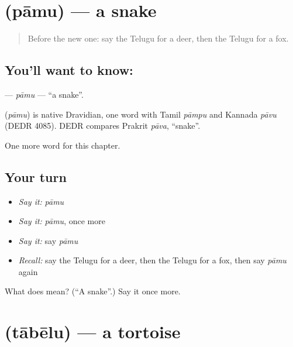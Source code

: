 \section[\texorpdfstring{\te{పాము} (pāmu)}{పాము (pāmu)}]{ (pāmu) — a snake}

\label{lesson:TE-C124-pamu}



\begin{quote}
Before the new one: say the Telugu for a deer, then the Telugu for a fox.
\end{quote}

\subsection*{You'll want to know: }
\textbf{} — \emph{pāmu} — \textquotedblleft{}a snake\textquotedblright{}.

\begin{cousinweb}
\textbf{} (\emph{pāmu}) is native Dravidian, one word with Tamil \emph{pāmpu} and Kannada \emph{pāvu} (DEDR 4085). DEDR compares Prakrit \emph{pāva}, \textquotedblleft{}snake\textquotedblright{}.
\end{cousinweb}

\begin{grammarlens}[title={What you've built}]
One more word for this chapter.
\end{grammarlens}

\subsection*{Your turn}
\begin{itemize}
\raggedright
  \item \emph{Say it:} \emph{pāmu}
  \item \emph{Say it:} \emph{pāmu}, once more
  \item \emph{Say it:} say \emph{pāmu}
  \item \emph{Recall:} say the Telugu for a deer, then the Telugu for a fox, then say \emph{pāmu} again
\end{itemize}

\begin{tcolorbox}[breakable,colback=teal!4,colframe=teal!35!black,title={Before you move on}]
What does  mean? (\textquotedblleft{}A snake\textquotedblright{}.) Say it once more.
\end{tcolorbox}
\section[\texorpdfstring{\te{తాబేలు} (tābēlu)}{తాబేలు (tābēlu)}]{ (tābēlu) — a tortoise}

